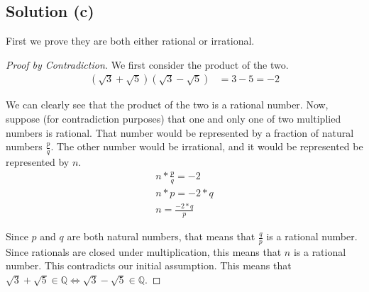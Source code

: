 \documentclass[12pt]{report}
\begin{document}
\subsection{Solution (c)}
First we prove they are both either rational or irrational.
\begin{proof}[Proof by Contradiction]
    We first consider the product of the two.
    \begin{align}
        (\sqrt{3} + \sqrt{5})(\sqrt{3} - \sqrt{5})
            &=  3 - 5
            =   -2
    \end{align}

    We can clearly see that the product of the two is a rational number. 
    Now, suppose (for contradiction purposes) that one and only one of two multiplied numbers is rational. 
    That number would be represented by a fraction of natural numbers $\frac{p}{q}$. 
    The other number would be irrational, and it would be represented be represented by $n$.
    \begin{gather}
        n*\frac{p}{q} = -2\\
        n * p = -2 * q\\
        n = \frac{-2*q}{p}
    \end{gather}

    Since $p$ and $q$ are both natural numbers, that means that $\frac{q}{p}$ is a rational number. 
    Since rationals are closed under multiplication, this means that $n$ is a rational number.
    This contradicts our initial assumption.
    This means that $\sqrt{3} + \sqrt{5} \in \mathbb{Q} \iff \sqrt{3} - \sqrt{5} \in \mathbb{Q}$.
\end{proof}
\end{document}
